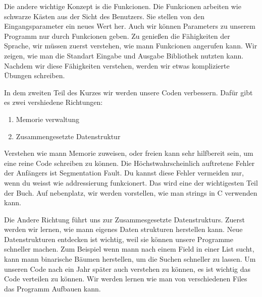 \documentclass{article}[12pt]
\begin{document}
Die andere wichtige Konzept is die Funkcionen. Die Funkcionen arbeiten wie schwarze K\"asten aus der Sicht des Benutzers. Sie stellen von 
den Eingangsparameter ein neues Wert her. Auch wir können Parameters zu unserem Programm nur durch Funkcionen geben.  Zu genießen
die Fähigkeiten der Sprache, wir müssen zuerst verstehen, wie mann Funkcionen angerufen kann. Wir zeigen,
wie man die Standart Eingabe und Ausgabe Bibliothek nutzten kann. Nachdem wir diese F\"ahigkeiten verstehen, werden wir etwas
komplizierte \"Ubungen schreiben.

In dem zweiten Teil des Kurzes wir werden unsere Coden verbessern. Dafür gibt es zwei vershiedene
Richtungen:
\begin{enumerate}
\item Memorie verwaltung
\item Zusammengesetzte Datenstruktur
\end{enumerate}

Verstehen wie mann Memorie zuweisen, oder freien kann sehr hilfbereit sein, um eine reine Code schreiben zu können. 
Die Höchstwahrscheinlich auftretene Fehler der Anfängers ist Segmentation Fault. Du kannst diese Fehler vermeiden nur, wenn
du weisst wie addressierung funkcionert. Das wird eine der wichtigesten Teil der Buch. Auf nebenplatz, wir werden
vorstellen, wie man strings in C verwenden kann.

Die Andere Richtung führt uns zur Zusammesgesetzte Datenstrukturs. Zuerst werden wir lernen, wie mann eigenes Daten strukturen herstellen 
kann. Neue Datenstrukturen entdecken ist wichtig, weil sie können unsere Programme schneller machen. Zum Beispiel wenn mann nach
einem Field in einer List sucht, kann mann binarische Bäumen herstellen, um die Suchen schneller zu lassen. Um unseren Code
nach ein Jahr später auch verstehen zu können, es ist wichtig das Code verteilen zu können. Wir werden lernen wie man
von verschiedenen Files das Programm Aufbauen kann.


\end{document}
